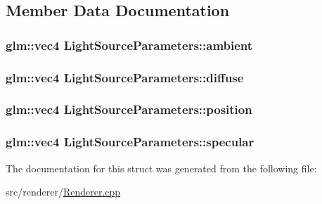 \subsection{Member Data Documentation}
\hypertarget{structLightSourceParameters_a9bf58f5dda9d0cacf29e3a09967f2f69}{
\subsubsection[{ambient}]{\setlength{\rightskip}{0pt plus 5cm}glm\-::vec4 Light\-Source\-Parameters\-::ambient}}\label{structLightSourceParameters_a9bf58f5dda9d0cacf29e3a09967f2f69}
\hypertarget{structLightSourceParameters_af305c134edfd9b808d4daae1f6d4f350}{
\subsubsection[{diffuse}]{\setlength{\rightskip}{0pt plus 5cm}glm\-::vec4 Light\-Source\-Parameters\-::diffuse}}\label{structLightSourceParameters_af305c134edfd9b808d4daae1f6d4f350}
\hypertarget{structLightSourceParameters_ac4f0e6f4af0349c409ac33492b1960a7}{
\subsubsection[{position}]{\setlength{\rightskip}{0pt plus 5cm}glm\-::vec4 Light\-Source\-Parameters\-::position}}\label{structLightSourceParameters_ac4f0e6f4af0349c409ac33492b1960a7}
\hypertarget{structLightSourceParameters_aac591da2e5f4e3639e376692d36c06de}{
\subsubsection[{specular}]{\setlength{\rightskip}{0pt plus 5cm}glm\-::vec4 Light\-Source\-Parameters\-::specular}}\label{structLightSourceParameters_aac591da2e5f4e3639e376692d36c06de}


The documentation for this struct was generated from the following file\-:\begin{DoxyCompactItemize}
\item 
src/renderer/\hyperlink{Renderer_8cpp}{Renderer.\-cpp}\end{DoxyCompactItemize}
